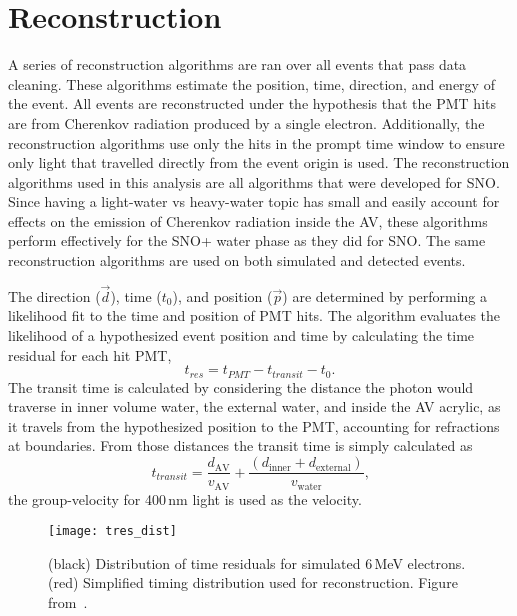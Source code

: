 \section{Reconstruction}
\label{sec:reconstruction}
A series of reconstruction algorithms are ran over all events that pass data cleaning.
These algorithms estimate the position, time, direction, and energy of the event.
All events are reconstructed under the hypothesis that the PMT hits are from Cherenkov radiation
produced by a single electron.
Additionally, the reconstruction algorithms use only the hits in the prompt time window to ensure only light
that travelled directly from the event origin is used.
The reconstruction algorithms used in this analysis are all algorithms
that were developed for SNO\@.
Since having a light-water vs heavy-water topic has small and easily account for
effects on the emission of Cherenkov radiation inside the AV, these algorithms
perform effectively for the SNO+ water phase as they did for SNO\@.
The same reconstruction algorithms are used on both simulated and detected events.

The direction ($\vec{d}$), time ($t_{0}$), and position ($\vec{p}$) are determined by performing a likelihood
fit to the time and position of PMT hits.
The algorithm evaluates the likelihood of a hypothesized event position and time by
calculating the time residual for each hit PMT,
\begin{equation}
\label{eqn:tres}
t_{res} = t_{PMT} - t_{transit} - t_{0}\text{.}
\end{equation}
The transit time is calculated by considering the distance the photon would
traverse in inner volume water, the external water, and inside the AV acrylic, as
it travels from the hypothesized position to the PMT, accounting for refractions
at boundaries.
From those distances the transit time is simply calculated as
\begin{equation}
t_{transit} = \frac{d_{\mathrm{AV}}}{v_{\mathrm{AV}}} + \frac{(d_{\mathrm{inner}} + d_{\mathrm{external}})}{v_{\mathrm{water}}}\text{,}
\end{equation}
the group-velocity for 400\,nm light is used as the velocity.

\begin{figure}[htbp]
\centering
\texttt{[image: tres\_dist]}
\caption[Simulated Distribution of $t_{\mathrm{res}}$]{
(black) Distribution of time residuals for simulated 6\,MeV electrons. (red) Simplified
timing distribution used for reconstruction. Figure from~\citep{richie_thesis}.}
\label{fig:tres_dist}
\end{figure}

